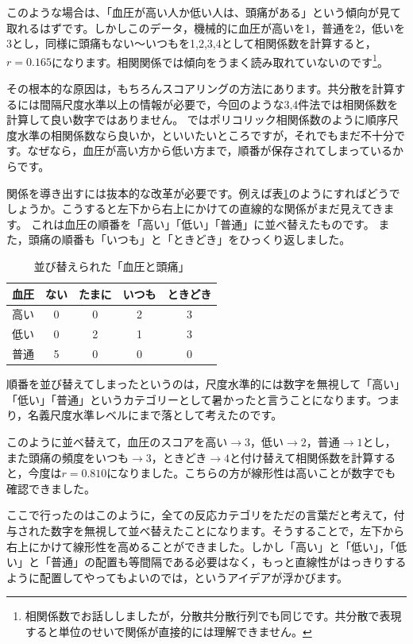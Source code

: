 \documentclass{ltjsbook}
\begin{document}
このような場合は、「血圧が高い人か低い人は、頭痛がある」という傾向が見て取れるはずです。しかしこのデータ，機械的に血圧が高いを1，普通を2，低いを3とし，同様に頭痛もない〜いつもを1,2,3,4として相関係数を計算すると，$r=0.165$になります。相関関係では傾向をうまく読み取れていないのです\footnote{相関係数でお話ししましたが，分散共分散行列でも同じです。共分散で表現すると単位のせいで関係が直接的には理解できません。}。

その根本的な原因は，もちろんスコアリングの方法にあります。共分散を計算するには間隔尺度水準以上の情報が必要で，今回のような3,4件法では相関係数を計算して良い数字ではありません。
ではポリコリック相関係数のように順序尺度水準の相関係数なら良いか，といいたいところですが，それでもまだ不十分です。なぜなら，血圧が高い方から低い方まで，順番が保存されてしまっているからです。

関係を導き出すには抜本的な改革が必要です。例えば表\ref{tbl::14_02}のようにすればどうでしょうか。こうすると左下から右上にかけての直線的な関係がまだ見えてきます。
これは血圧の順番を「高い」「低い」「普通」に並べ替えたものです。
また，頭痛の順番も「いつも」と「ときどき」をひっくり返しました。
\begin{table}[h]
	\begin{center}
	\caption{並び替えられた「血圧と頭痛」}
	\begin{tabular}{c|cccc}
	血圧&ない&たまに&いつも&ときどき\\
	\hline
	高い&0&0&2&3\\
	低い&0&2&1&3\\
	普通&5&0&0&0\\
	\end{tabular}
	\label{tbl::14_02}
	\end{center}
\end{table}
順番を並び替えてしまったというのは，尺度水準的には数字を無視して「高い」「低い」「普通」というカテゴリーとして暑かったと言うことになります。つまり，名義尺度水準レベルにまで落として考えたのです。

このように並べ替えて，血圧のスコアを高い$\to3$，低い$\to2$，普通$\to1$とし，また頭痛の頻度をいつも$\to3$，ときどき$\to4$と付け替えて相関係数を計算すると，今度は$r=0.810$になりました。こちらの方が線形性は高いことが数字でも確認できました。

ここで行ったのはこのように，全ての反応カテゴリをただの言葉だと考えて，付与された数字を無視して並べ替えたことになります。そうすることで，左下から右上にかけて線形性を高めることができました。しかし「高い」と「低い」，「低い」と「普通」の配置も等間隔である必要はなく，もっと直線性がはっきりするように配置してやってもよいのでは，というアイデアが浮かびます。
\end{document}
